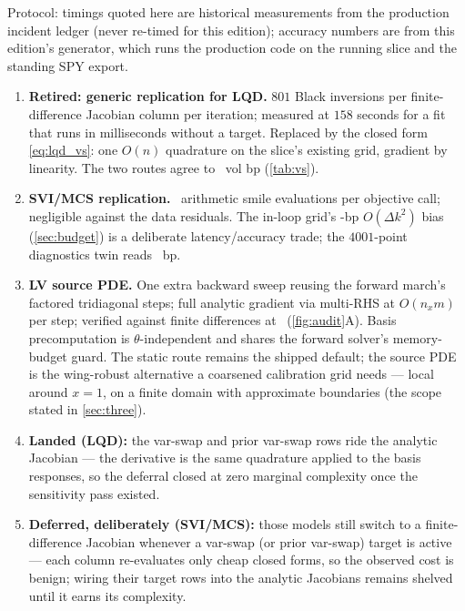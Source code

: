 \documentclass[11pt]{article}
\begin{document}
Protocol: timings quoted here are historical measurements from the
production incident ledger (never re-timed for this edition); accuracy
numbers are from this edition's generator, which runs the production
code on the running slice and the standing SPY export.

\begin{enumerate}[leftmargin=1.6em]
\item \textbf{Retired: generic replication for LQD.}  $801$ Black
inversions per finite-difference Jacobian column per iteration; measured
at $158$ seconds for a fit that runs in milliseconds without a target.
Replaced by the closed form \eqref{eq:lqd_vs}: one $O(n)$ quadrature on
the slice's existing grid, gradient by linearity.  The two routes agree
to \vsragreebp\ vol bp (\cref{tab:vs}).
\item \textbf{SVI/MCS replication.}  \vsrpoints\ arithmetic smile
evaluations per objective call; negligible against the data residuals.
The in-loop grid's \vsragreebp-bp $O(\Delta k^2)$ bias
(\cref{sec:budget}) is a deliberate latency/accuracy trade; the
$4001$-point diagnostics twin reads \vsrreplfinebp\ bp.
\item \textbf{LV source PDE.}  One extra backward sweep reusing the
forward march's factored tridiagonal steps; full analytic gradient via
multi-RHS at $O(n_x m)$ per step; verified against finite differences
at \vsrsensabs\ (\cref{fig:audit}A).  Basis precomputation is
$\theta$-independent and shares the forward solver's memory-budget
guard.  The static route remains the shipped default; the source PDE is
the wing-robust alternative a coarsened calibration grid needs ---
local around $x=1$, on a finite domain with approximate boundaries
(the scope stated in \cref{sec:three}).
\item \textbf{Landed (LQD):} the var-swap and prior var-swap rows ride
the analytic Jacobian --- the derivative is the same quadrature applied
to the basis responses, so the deferral closed at zero marginal
complexity once the sensitivity pass existed.
\item \textbf{Deferred, deliberately (SVI/MCS):} those models still
switch to a finite-difference Jacobian whenever a var-swap (or prior
var-swap) target is active --- each column re-evaluates only cheap
closed forms, so the observed cost is benign; wiring their target rows
into the analytic Jacobians remains shelved until it earns its
complexity.
\end{enumerate}

\end{document}
